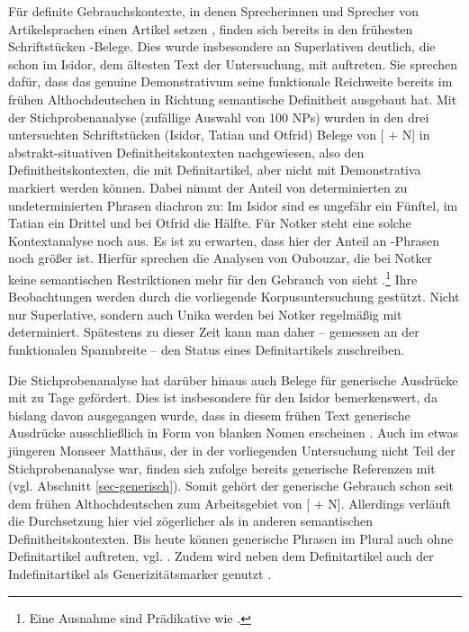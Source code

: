 Für definite Gebrauchskontexte, in denen Sprecherinnen und Sprecher von Artikelsprachen einen Artikel setzen  \parencite[832]{Himmelmann2001}, finden sich bereits in den frühesten Schriftstücken  -Belege. Dies wurde insbesondere an Superlativen deutlich, die schon im Isidor, dem ältesten Text der Untersuchung, mit  auftreten. Sie sprechen dafür, dass das genuine Demonstrativum seine funktionale Reichweite bereits im frühen Althochdeutschen in Richtung semantische Definitheit ausgebaut hat. Mit der Stichprobenanalyse (zufällige Auswahl von 100 NPs) wurden in den drei untersuchten Schriftstücken (Isidor, Tatian und Otfrid) Belege von [ + N] in abstrakt-situativen Definitheitskontexten nachgewiesen, also den Definitheitskontexten, die mit Definitartikel, aber nicht mit Demonstrativa markiert werden können. Dabei nimmt der Anteil von determinierten zu undeterminierten Phrasen diachron zu: Im Isidor sind es ungefähr ein Fünftel, im Tatian ein Drittel und bei Otfrid die Hälfte. Für Notker steht eine solche Kontextanalyse noch aus. Es ist zu erwarten, dass hier der Anteil an -Phrasen noch größer ist. Hierfür sprechen die Analysen von Oubouzar, die bei Notker keine semantischen Restriktionen mehr für den Gebrauch von  sieht \parencite[573]{Oubouzar1989}.\footnote{Eine Ausnahme sind Prädikative wie .} Ihre Beobachtungen werden durch die vorliegende Korpusuntersuchung gestützt. Nicht nur Superlative, sondern auch Unika werden bei Notker regelmäßig mit  determiniert. Spätestens zu dieser Zeit kann man daher -- gemessen an der funktionalen Spannbreite --  den Status eines Definitartikels zuschreiben. 

Die Stichprobenanalyse hat darüber hinaus auch Belege für generische Ausdrücke mit  zu Tage gefördert. Dies ist insbesondere für den Isidor bemerkenswert, da bislang davon ausgegangen wurde, dass in diesem frühen Text generische Ausdrücke ausschließlich in Form von blanken Nomen erscheinen \parencites()()[80]{Oubouzar1992}[145]{Kraiss2012}. Auch im etwas jüngeren Monseer Matthäus, der in der vorliegenden Untersuchung nicht Teil der Stichprobenanalyse war, finden sich \textcite{Hodler1954} zufolge bereits generische Referenzen mit  (vgl. Abschnitt \ref{sec-generisch}). Somit gehört der generische Gebrauch schon seit dem frühen Althochdeutschen zum Arbeitsgebiet von [ + N].  Allerdings verläuft die Durchsetzung hier viel zögerlicher als in anderen semantischen Definitheitskontexten. Bis heute können generische Phrasen im  Plural auch ohne Definitartikel auftreten, vgl.  \parencite[][145]{Barton2015}. Zudem wird neben dem Definitartikel auch der Indefinitartikel als Generizitätsmarker genutzt \parencite{Petrova2020}.

